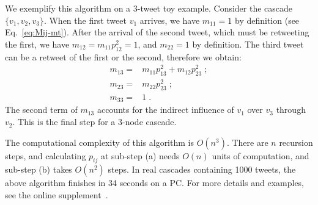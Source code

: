 We exemplify this algorithm on a 3-tweet toy example. 
Consider the cascade $\{v_1, v_2, v_3\}$.
When the first tweet $v_1$ arrives, we have $m_{11} = 1$ by definition (see Eq.~\eqref{eq:Mij-mt}).
%
After the arrival of the second tweet, which must be retweeting the first, we have 
$m_{12}= m_{11} p^2_{12}=1$, and $m_{22} = 1$ by definition.
The third tweet can be a retweet of the first or the second, therefore we obtain: 
\begin{align*}
	m_{13} =& m_{11} p^2_{13} + m_{12} p^2_{23} \; ;\\
	m_{23} =& m_{22} p^2_{23} \; ;\\
	m_{33} =& 1 \;.
\end{align*}
The second term of $m_{13}$ accounts for the indirect influence of $v_1$ over $v_3$ through $v_2$.
This is the final step for a 3-node cascade. 

The computational complexity of this algorithm is $O(n^3)$.
There are $n$ recursion steps, and calculating $p_{ij}$ at sub-step (a) needs $O(n)$ units of computation, and sub-step (b) takes $O(n^2)$ steps.
In real cascades containing 1000 tweets, the above algorithm finishes in 34 seconds on a PC.
For more details and examples, see the online supplement~\cite[annex~B]{supplemental}.

